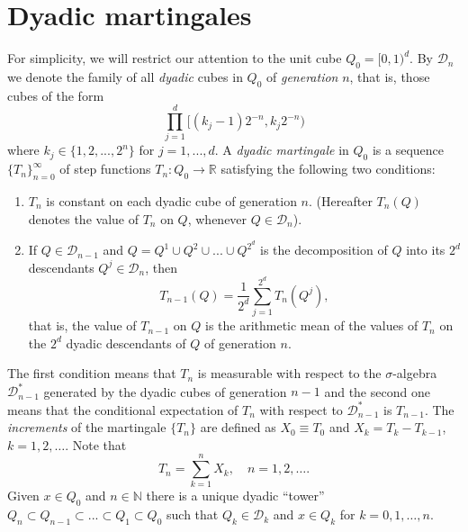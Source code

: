 \documentclass[11pt,letterpaper]{amsart}
\theoremstyle{definition}
\numberwithin{equation}{section}
\newcommand{\R}{\mathbb R}
\newcommand{\N}{\mathbb N}
\begin{document}
\section{Dyadic martingales}


For simplicity, we will restrict our attention to the unit cube $Q_0 = [0,1)^d$. By $\mathcal{D}_n$ we denote the family of all \textit{dyadic} cubes in $Q_0$ of \textit{generation} $n$, that is,  those cubes of the form
$$
\prod_{j=1}^d [(k_j -1) 2^{-n}, k_j 2^{-n} )
$$
where $k_j \in \{1, 2,..., 2^n   \}$ for $j= 1,...,d$. A \textit{dyadic martingale} in $Q_0$ is a sequence $\{ T_n \}_{n=0}^{\infty}$ of step functions $T_n : Q_0 \to \R$ satisfying the following two conditions:

\begin{enumerate}
\item  $T_n$ is constant on each dyadic cube of generation $n$. (Hereafter $T_n(Q)$ denotes the value of $T_n$ on $Q$, whenever $Q\in \mathcal{D}_n$).
\item If $Q \in \mathcal{D}_{n-1} $ and $Q = Q^1 \cup Q^2 \cup ... \cup Q^{2^d}$ is the decomposition of $Q$ into  its $2^d$ descendants $Q^j \in \mathcal{D}_{n}$, then
$$
T_{n-1}(Q) = \frac{1}{2^d}\sum_{j=1}^{2^d} T_n (Q^j), 
$$
that is, the value of $T_{n-1}$ on $Q$ is the arithmetic mean of the values of $T_n$ on the $2^d$ dyadic descendants of $Q$ of generation $n$. 
\end{enumerate}
\noindent The first condition means that $T_n$ is measurable with respect to the $\sigma$-algebra $\mathcal{D}_{n-1}^*$ generated by the dyadic cubes of generation $n-1$ and the second one means that the conditional expectation of $T_n$ with respect to $\mathcal{D}_{n-1}^*$ is $T_{n-1}$. The \textit{increments} of the martingale $\{T_n \}$ are defined as $X_0 \equiv T_0$ and $X_k = T_k - T_{k-1}$, $k=1,2,\ldots$. Note that 
$$
T_n = \sum_{k=1}^{n} X_k, \quad n=1,2,\ldots .
$$
Given $x\in Q_0$ and $n\in \N$ there is a unique  dyadic ``tower'' $Q_n \subset Q_{n-1} \subset ... \subset Q_1 \subset Q_0$ such that $Q_k \in \mathcal{D}_k$ and $x\in Q_k$ for $k = 0,1, \ldots , n$. 
\end{document}
